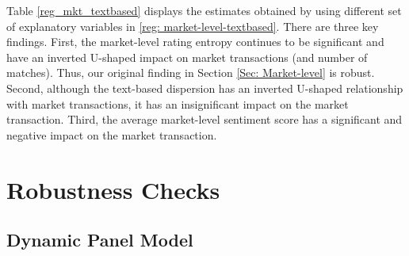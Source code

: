 \documentclass[msom,blindrev]{informs3}
\begin{document}
	
	
	Table \ref{reg_mkt_textbased} displays the estimates obtained by using different set of explanatory variables in \eqref{reg: market-level-textbased}. There are three key findings. First, the  market-level rating entropy continues to be significant and have an inverted U-shaped impact on market transactions (and number of matches). Thus, our original finding in Section \ref{Sec: Market-level} is robust.  Second, although the text-based dispersion has an inverted U-shaped relationship with market transactions, it has an insignificant impact on the market transaction.  Third, the average market-level sentiment score has a significant and negative impact on the market transaction.
	
	
	
\section{Robustness Checks} \label{Sec: Robustness}
	
\subsection{Dynamic Panel Model}  \label{Sec: Dynamic Panel}
	
\end{document}
